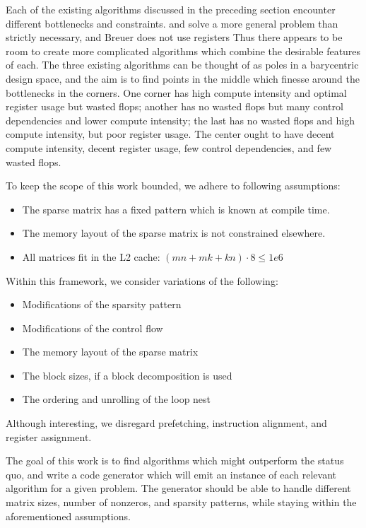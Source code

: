   Each of the existing algorithms discussed in the preceding section encounter different  bottlenecks and constraints.  and  solve a more general problem than strictly necessary, and Breuer does not use registers Thus there appears to be room to create more complicated algorithms which combine the desirable features of each. The three existing algorithms can be thought of as poles in a barycentric design space, and the aim is to find points in the middle which finesse around the bottlenecks in the corners. One corner has high compute intensity and optimal register usage but wasted flops; another has no wasted flops but many control dependencies and lower compute intensity; the last has no wasted flops and high compute intensity, but poor register usage. The center ought to have decent compute intensity, decent register usage, few control dependencies, and few wasted flops. 


  To keep the scope of this work bounded, we adhere to following assumptions:
  \begin{itemize}
    \item The sparse matrix has a fixed pattern which is known at compile time.
    \item The memory layout of the sparse matrix is not constrained elsewhere.
    \item All matrices fit in the L2 cache: $(mn + mk + kn)\cdot 8 \leq 1e6$
  \end{itemize}

  Within this framework, we consider variations of the following:
  \begin{itemize}
    \item Modifications of the sparsity pattern
    \item Modifications of the control flow
    \item The memory layout of the sparse matrix
    \item The block sizes, if a block decomposition is used
    \item The ordering and unrolling of the loop nest
  \end{itemize}


Although interesting, we disregard prefetching, instruction alignment, and register assignment. 

The goal of this work is to find algorithms which might outperform the status quo, and write a code generator which will emit an instance of each relevant algorithm for a given problem. The generator should be able to handle different matrix sizes, number of nonzeros, and sparsity patterns, while staying within the aforementioned assumptions. 

